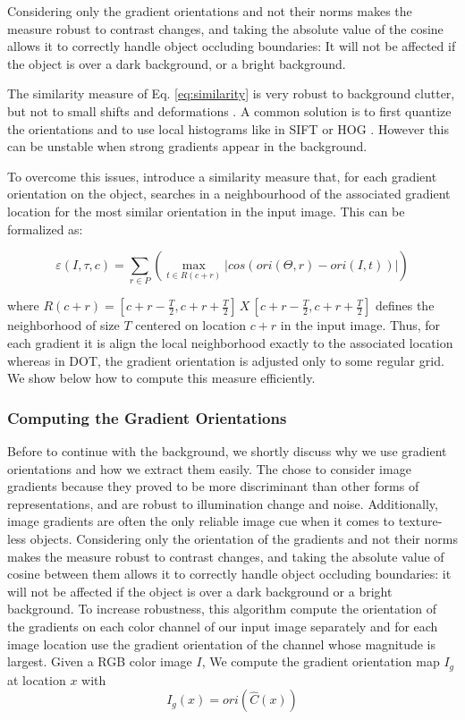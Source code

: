 Considering only the gradient orientations and not their norms makes the measure
robust to contrast changes, and taking the absolute value of the cosine allows it
to correctly handle object occluding boundaries: It will not be affected if the object 
is over a dark background, or a bright background.

The similarity measure of Eq. \ref{eq:similarity} is very robust to background clutter,
but not to small shifts and deformations . A common solution is to first
quantize the orientations and to use local histograms like in SIFT \citet{Lowe2004} 
or HOG \citet{Dalal2005}. However this can be unstable when strong gradients appear 
in the background.

To overcome this issues, \citet{Hinterstoisser2011} introduce a similarity measure
that, for each gradient orientation on the object, searches in a neighbourhood of
the associated gradient location for the most similar orientation in the input image.
This can be formalized as:


\begin{equation}
\label{eq:newsimilarity}
\varepsilon(I, \tau, c) = \sum_{r \in P}\left( \max\limits_{t \in R(c+r)}\left|cos(ori(\Theta,r) - ori(I,t))\right|\right)
\end{equation}

where $R(c+r)=[c+r-\frac{T}{2}, c+r+\frac{T}{2}]\,X\,[c+r-\frac{T}{2}, c+r+\frac{T}{2}]$
defines the neighborhood of size $T$ centered on location $c+r$ in the input image.
Thus, for each gradient it is align the local neighborhood exactly to the associated 
location whereas in DOT, the gradient orientation is adjusted only to some regular grid. 
We show below how to compute this measure efficiently.

\subsubsection{Computing the Gradient Orientations}
Before to continue with the background, we shortly discuss why we use gradient orientations 
and how we extract them easily.
The chose to consider image gradients because they proved to be more discriminant than
other forms of representations, and are robust to illumination change and noise. Additionally,
 image gradients are often the only reliable image cue when it comes to 
texture-less objects. Considering only the orientation of the gradients and not their
norms makes the measure robust to contrast changes, and taking the absolute value of
cosine between them allows it to correctly handle object occluding boundaries: it will 
not be affected if the object is over a dark background or a bright background.
To increase robustness, this algorithm compute the orientation of the gradients on
each color channel of our input image separately and for each image location use the 
gradient orientation of the channel whose magnitude is largest. Given a RGB color image $I$, 
We compute the gradient orientation map $I_g$ at location $x$ with
\begin{equation}
I_g(x)=ori(\hat{C}(x))
\end{equation}


